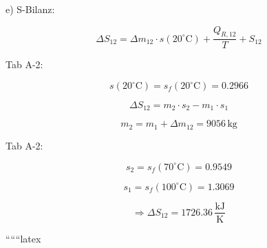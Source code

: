 e) S-Bilanz:

\[
\Delta S_{12} = \Delta m_{12} \cdot s(20^\circ \text{C}) + \frac{Q_{R,12}}{T} + S_{12}
\]

Tab A-2:

\[
s(20^\circ \text{C}) = s_f(20^\circ \text{C}) = 0.2966
\]

\[
\Delta S_{12} = m_2 \cdot s_2 - m_1 \cdot s_1
\]

\[
m_2 = m_1 + \Delta m_{12} = 9056 \, \text{kg}
\]

Tab A-2:

\[
s_2 = s_f(70^\circ \text{C}) = 0.9549
\]

\[
s_1 = s_f(100^\circ \text{C}) = 1.3069
\]

\[
\Rightarrow \Delta S_{12} = 1726.36 \, \frac{\text{kJ}}{\text{K}}
\]

``````latex